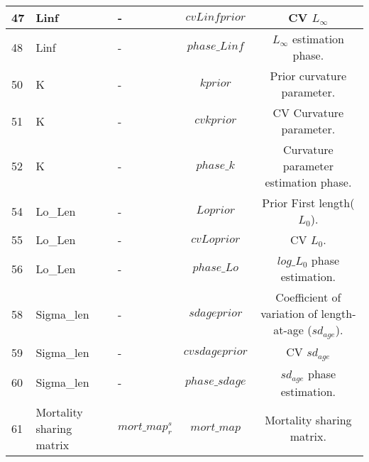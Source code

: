 \documentclass{article}
\begin{document}
\begin{tabular}{|  p{0.9cm} | p{1.9cm}  | p{1.9cm} | c | c |}
47 &  Linf &  - & $cvLinfprior$ & CV $L_{\infty}$\\ \hline
48 &  Linf & -  & $phase\_Linf$ & $L_{\infty}$ estimation phase.\\ \hline
50 &  K &  - & $kprior$ & Prior curvature parameter.\\ \hline
51 & K & -  & $cvkprior$ & CV Curvature parameter.\\ \hline
52 &  K & -  & $phase\_k$ & Curvature parameter estimation phase.\\ \hline
54 &  Lo\_Len &  - & $Loprior$ & Prior First length($L_0$).\\ \hline
55 &  Lo\_Len  &  - & $cvLoprior$ & CV $L_0$.\\ \hline
56 &  Lo\_Len  & -  & $phase\_Lo$ & $log\_L_0$ phase estimation.\\ \hline
58 &  Sigma\_len  & -  &  
 $sdageprior$ & Coefficient of variation of length-at-age ($sd_{age}$).\\ \hline
59 &  Sigma\_len  & -  & $cvsdageprior$ & CV $sd_{age}$\\ \hline
60 &  Sigma\_len  &  - & $phase\_sdage$  & $sd_{age}$ phase estimation.\\ \hline
61 &  Mortality sharing matrix  & $mort\_map^s_r$   & $mort\_map$  & Mortality sharing matrix.\\ \hline


\end{tabular} 
\end{document}
